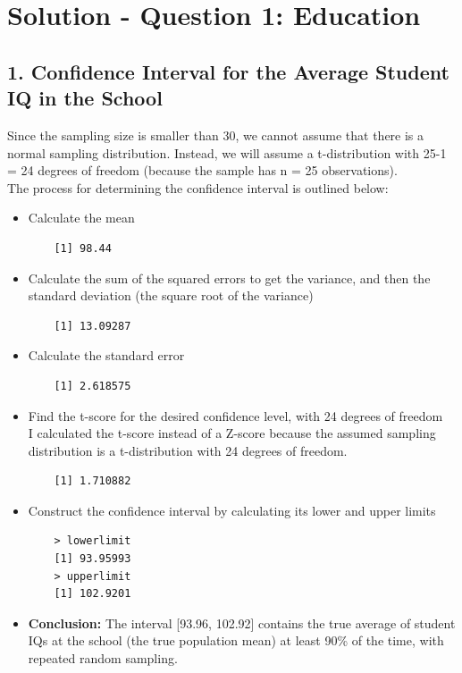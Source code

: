 \documentclass[12pt,letterpaper]{article}
\begin{document}
\newpage
	\section*{Solution - Question 1: Education}
\vspace{.5cm}
\subsection*{1. Confidence Interval for the Average Student IQ in the School} 
\vspace{.5cm}
Since the sampling size is smaller than 30, we cannot assume that there is a normal sampling distribution. Instead, we will assume a t-distribution with 25-1 = 24 degrees of freedom (because the sample has n = 25 observations). \\[0.5cm]
The process for determining the confidence interval is outlined below: 
\begin{itemize}
	\item 
	Calculate the mean 
	 
  \begin{verbatim}
  	[1] 98.44
  \end{verbatim}
  \item 
  Calculate the sum of the squared errors to get the variance, and then the  standard deviation (the square root of the variance)
  	 
  \begin{verbatim}
  	[1] 13.09287
  \end{verbatim}
  \item 
  Calculate the standard error 
   
  \begin{verbatim}
  	[1] 2.618575
  \end{verbatim}
   \item 
  Find the t-score for the desired confidence level, with 24 degrees of freedom \\
  I calculated the t-score instead of a Z-score because the assumed sampling distribution is a t-distribution with 24 degrees of freedom. 
   
  \begin{verbatim}
  	[1] 1.710882
  \end{verbatim}
  \newpage
   \item 
  Construct the confidence interval by calculating its lower and upper limits
   
  \begin{verbatim}
  	> lowerlimit
  	[1] 93.95993
  	> upperlimit
  	[1] 102.9201
  \end{verbatim}
  \item 
  \textbf{Conclusion:} The interval [93.96, 102.92] contains the true average of student IQs at the school (the true population mean) at least 90\% of the time, with repeated random sampling.  
  \end{itemize}
\vspace{1cm}
\end{document}
